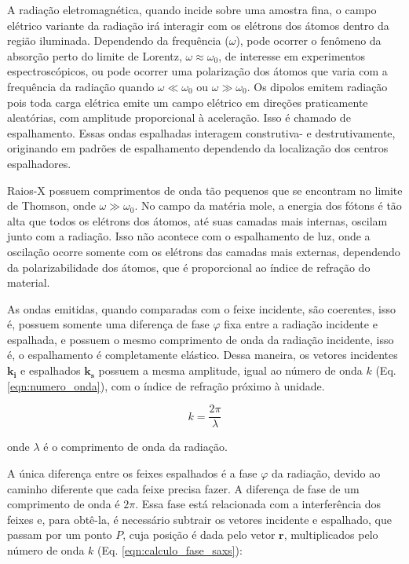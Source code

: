 		A radiação eletromagnética, quando incide sobre uma amostra fina, o campo elétrico variante da radiação irá interagir com os elétrons dos átomos dentro da região iluminada. Dependendo da frequência (\(\omega\)), pode ocorrer o fenômeno da absorção perto do limite de Lorentz, \(\omega \approx \omega_0\), de interesse em experimentos espectroscópicos, ou pode ocorrer uma polarização dos átomos que varia com a frequência da radiação quando \(\omega \ll \omega_0\) ou \(\omega \gg \omega_0\). Os dipolos emitem radiação pois toda carga elétrica emite um campo elétrico em direções praticamente aleatórias, com amplitude proporcional à aceleração. Isso é chamado de espalhamento. Essas ondas espalhadas interagem construtiva- e destrutivamente, originando em padrões de espalhamento dependendo da localização dos centros espalhadores.
		
		Raios-X possuem comprimentos de onda tão pequenos que se encontram no limite de Thomson, onde \(\omega \gg \omega_0\). No campo da matéria mole, a energia dos fótons é tão alta que todos os elétrons dos átomos, até suas camadas mais internas, oscilam junto com a radiação. Isso não acontece com o espalhamento de luz, onde a oscilação ocorre somente com os elétrons das camadas mais externas, dependendo da polarizabilidade dos átomos, que é proporcional ao índice de refração do material. %
		
		As ondas emitidas, quando comparadas com o feixe incidente, são coerentes, isso é, possuem somente uma diferença de fase \(\varphi\) fixa entre a radiação incidente e espalhada, e possuem o mesmo comprimento de onda da radiação incidente, isso é, o espalhamento é completamente elástico. Dessa maneira, os vetores incidentes \(\mathbf{k_i}\) e espalhados \(\mathbf{k_s}\) possuem a mesma amplitude, igual ao número de onda \(k\) (Eq. \ref{eqn:numero_onda}), com o índice de refração próximo à unidade.
		
		\begin{equation}
			k = \dfrac{2 \pi}{\lambda}
			\label{eqn:numero_onda}
		\end{equation}
		
		\noindent onde \(\lambda\) é o comprimento de onda da radiação.
		
		A única diferença entre os feixes espalhados é a fase \(\varphi\) da radiação, devido ao caminho diferente que cada feixe precisa fazer. A diferença de fase de um comprimento de onda é \(2\pi\). Essa fase está relacionada com a interferência dos feixes e, para obtê-la, é necessário subtrair os vetores incidente e espalhado, que passam por um ponto \(P\), cuja posição é dada pelo vetor \(\mathbf{r}\), multiplicados pelo número de onda \(k\) (Eq. \ref{eqn:calculo_fase_saxs}):
		
